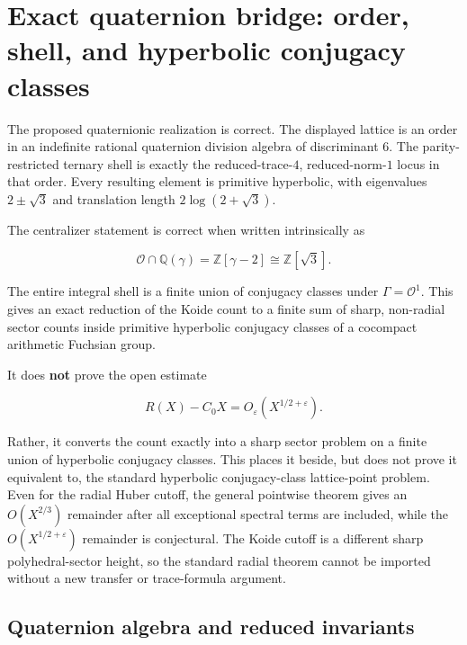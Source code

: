 \section{Exact quaternion bridge: order, shell, and hyperbolic conjugacy classes}\label{koide-quat-exact-quaternion-bridge-order-shell-and-hyperbolic-conjugacy-classes}

The proposed quaternionic realization is correct. The displayed lattice is an order in an indefinite rational quaternion division algebra of discriminant \(6\). The parity-restricted ternary shell is exactly the reduced-trace-\(4\), reduced-norm-\(1\) locus in that order. Every resulting element is primitive hyperbolic, with eigenvalues \(2\pm\sqrt3\) and translation length \(2\log(2+\sqrt3)\).

The centralizer statement is correct when written intrinsically as

\[
 \mathcal O\cap\mathbb Q(\gamma)
 =\mathbb Z[\gamma-2]\cong\mathbb Z[\sqrt3].
\]

The entire integral shell is a finite union of conjugacy classes under \(\Gamma=\mathcal O^1\). This gives an exact reduction of the Koide count to a finite sum of sharp, non-radial sector counts inside primitive hyperbolic conjugacy classes of a cocompact arithmetic Fuchsian group.

It does \textbf{not} prove the open estimate

\[
 R(X)-C_0X=O_\varepsilon(X^{1/2+\varepsilon}).
\]

Rather, it converts the count exactly into a sharp sector problem on a finite union of hyperbolic conjugacy classes. This places it beside, but does not prove it equivalent to, the standard hyperbolic conjugacy-class lattice-point problem. Even for the radial Huber cutoff, the general pointwise theorem gives an \(O(X^{2/3})\) remainder after all exceptional spectral terms are included, while the \(O(X^{1/2+\varepsilon})\) remainder is conjectural. The Koide cutoff is a different sharp polyhedral-sector height, so the standard radial theorem cannot be imported without a new transfer or trace-formula argument.

\subsection{Quaternion algebra and reduced invariants}\label{koide-quat-quaternion-algebra-and-reduced-invariants}

